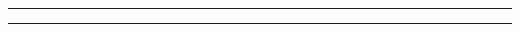 \noindent\rule{7in}{1.5pt}


\begin{problem}{9.10}

\end{problem}
\begin{solution}

\end{solution}

\noindent\rule{7in}{1.5pt}

